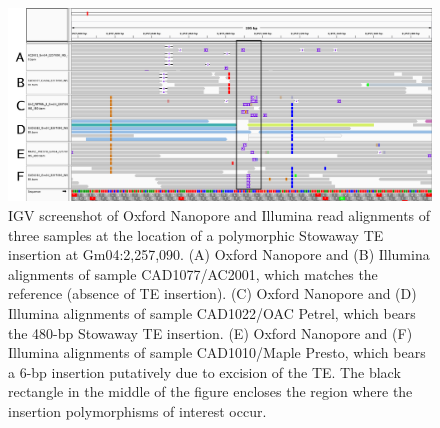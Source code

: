 \documentclass[12pt]{article}
\newenvironment{lsfigure}
	{\begin{landscape} \begin{figure} \centering}
	{\end{figure} \end{landscape}}
\begin{document}
\begin{lsfigure}
	\includegraphics[width = 9.5in]{Gm04_2257090_annotated}

	\caption[IGV screenshot of Oxford Nanopore and Illumina read alignments of three samples at the location of a polymorphic Stowaway TE insertion]{
		IGV screenshot of Oxford Nanopore and Illumina read alignments of three samples at the location of a polymorphic Stowaway TE insertion at Gm04:2,257,090.
		(A) Oxford Nanopore and (B) Illumina alignments of sample CAD1077/AC2001, which matches the reference (absence of TE insertion).
		(C) Oxford Nanopore and (D) Illumina alignments of sample CAD1022/OAC Petrel, which bears the 480-bp Stowaway TE insertion.
		(E) Oxford Nanopore and (F) Illumina alignments of sample CAD1010/Maple Presto, which bears a 6-bp insertion putatively due to excision of the TE.
		The black rectangle in the middle of the figure encloses the region where the insertion polymorphisms of interest occur.
	}

	\label{fig_s20}

\end{lsfigure}

\clearpage%
\end{document}
